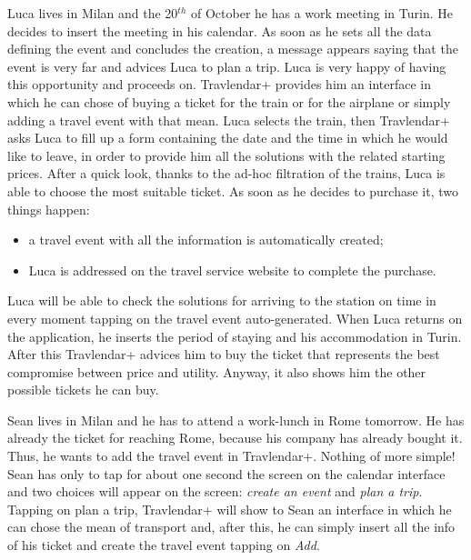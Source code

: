 Luca lives in Milan and the 20$^{th}$ of October he has a work meeting in Turin. He decides to insert the meeting in his calendar. As soon as he sets all the data defining the event and concludes the creation, a message appears saying that the event is very far and advices Luca to plan a trip. Luca is very happy of having this opportunity and proceeds on. Travlendar+ provides him an interface in which he can chose of buying a ticket for the train or for the airplane or simply adding a travel event with that mean. Luca selects the train, then Travlendar+ asks Luca to fill up a form containing the date and the time in which he would like to leave, in order to provide him all the solutions with the related starting prices. After a quick look, thanks to the ad-hoc filtration of the trains, Luca is able to choose the most suitable ticket. As soon as he decides to purchase it, two things happen: 
\begin{itemize}
	\setlength{\leftskip}{0.5cm}
	\item a travel event with all the information is automatically created;
	\item Luca is addressed on the travel service website to complete the purchase.
\end{itemize}
Luca will be able to check the solutions for arriving to the station on time in every moment tapping on the travel event auto-generated.
When Luca returns on the application, he inserts the period of staying and his accommodation in Turin. After this Travlendar+ advices him to buy the ticket that represents the best compromise between price and utility. Anyway, it also shows him the other possible tickets he can buy.

Sean lives in Milan and he has to attend a work-lunch in Rome tomorrow. He has already the ticket for reaching Rome, because his company has already bought it. Thus, he wants to add the travel event in Travlendar+. Nothing of more simple! Sean has only to tap for about one second the screen on the calendar interface and two choices will appear on the screen: \emph{create an event} and \emph{plan a trip}. Tapping on plan a trip, Travlendar+ will show to Sean an interface in which he can chose the mean of transport and, after this, he can simply insert all the info of his ticket and create the travel event tapping on \emph{Add}.

